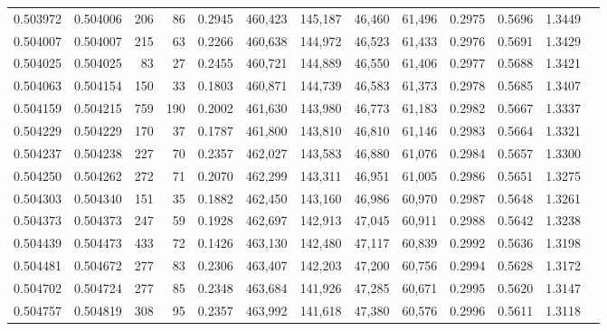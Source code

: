 \begin{tabular}{rrrrrrrrrrrrr}
0.503972 & 0.504006 &   206 &    86 &                                     0.2945 & 460,423 & 145,187 &  46,460 &  61,496 & 0.2975 & 0.5696 & 1.3449 \\
0.504007 & 0.504007 &   215 &    63 &                                     0.2266 & 460,638 & 144,972 &  46,523 &  61,433 & 0.2976 & 0.5691 & 1.3429 \\
0.504025 & 0.504025 &    83 &    27 &                                     0.2455 & 460,721 & 144,889 &  46,550 &  61,406 & 0.2977 & 0.5688 & 1.3421 \\
0.504063 & 0.504154 &   150 &    33 &                                     0.1803 & 460,871 & 144,739 &  46,583 &  61,373 & 0.2978 & 0.5685 & 1.3407 \\
0.504159 & 0.504215 &   759 &   190 &                                     0.2002 & 461,630 & 143,980 &  46,773 &  61,183 & 0.2982 & 0.5667 & 1.3337 \\
0.504229 & 0.504229 &   170 &    37 &                                     0.1787 & 461,800 & 143,810 &  46,810 &  61,146 & 0.2983 & 0.5664 & 1.3321 \\
0.504237 & 0.504238 &   227 &    70 &                                     0.2357 & 462,027 & 143,583 &  46,880 &  61,076 & 0.2984 & 0.5657 & 1.3300 \\
0.504250 & 0.504262 &   272 &    71 &                                     0.2070 & 462,299 & 143,311 &  46,951 &  61,005 & 0.2986 & 0.5651 & 1.3275 \\
0.504303 & 0.504340 &   151 &    35 &                                     0.1882 & 462,450 & 143,160 &  46,986 &  60,970 & 0.2987 & 0.5648 & 1.3261 \\
0.504373 & 0.504373 &   247 &    59 &                                     0.1928 & 462,697 & 142,913 &  47,045 &  60,911 & 0.2988 & 0.5642 & 1.3238 \\
0.504439 & 0.504473 &   433 &    72 &                                     0.1426 & 463,130 & 142,480 &  47,117 &  60,839 & 0.2992 & 0.5636 & 1.3198 \\
0.504481 & 0.504672 &   277 &    83 &                                     0.2306 & 463,407 & 142,203 &  47,200 &  60,756 & 0.2994 & 0.5628 & 1.3172 \\
0.504702 & 0.504724 &   277 &    85 &                                     0.2348 & 463,684 & 141,926 &  47,285 &  60,671 & 0.2995 & 0.5620 & 1.3147 \\
0.504757 & 0.504819 &   308 &    95 &                                     0.2357 & 463,992 & 141,618 &  47,380 &  60,576 & 0.2996 & 0.5611 & 1.3118 \\

\end{tabular}
